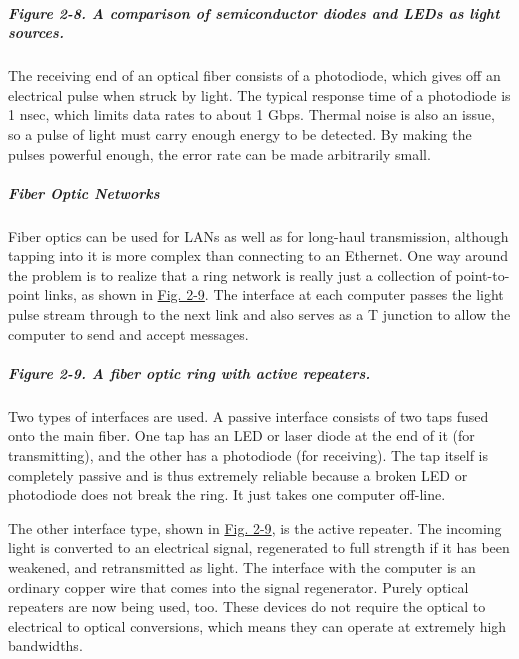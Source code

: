 \subparagraph[Figure 2-8. A comparison of semiconductor diodes and LEDs
as light
sources.]{\texorpdfstring{\protect\hypertarget{0130661023_ch02lev1sec2.htmlux5cux23ch02fig08}{}{}Figure
2-8. A comparison of semiconductor diodes and LEDs as light
sources.}{Figure 2-8. A comparison of semiconductor diodes and LEDs as light sources.}}


The receiving end of an optical fiber consists of a photodiode, which
gives off an electrical pulse when struck by light. The typical response
time of a photodiode is 1 nsec, which limits data rates to about 1 Gbps.
Thermal noise is also an issue, so a pulse of light must carry enough
energy to be detected. By making the pulses powerful enough, the error
rate can be made arbitrarily small.

\protect\hypertarget{0130661023_ch02lev1sec2.htmlux5cux23ch02lev3sec3}{}{}

\subparagraph{Fiber Optic Networks}

Fiber optics can be used for LANs as well as for long-haul transmission,
although tapping into it is more complex than connecting to an Ethernet.
One way around the problem is to realize that a ring network is really
just a collection of point-to-point links, as shown in
\protect\hyperlink{0130661023_ch02lev1sec2.htmlux5cux23ch02fig09}{Fig.
2-9}. The interface at each computer passes the light pulse stream
through to the next link and also serves as a T junction to allow the
computer to send and accept messages.

\subparagraph[Figure 2-9. A fiber optic ring with active
repeaters.]{\texorpdfstring{\protect\hypertarget{0130661023_ch02lev1sec2.htmlux5cux23ch02fig09}{}{}Figure
2-9. A fiber optic ring with active
repeaters.}{Figure 2-9. A fiber optic ring with active repeaters.}}


Two types of interfaces are used. A passive interface consists of two
taps fused onto the main fiber. One tap has an LED or laser diode at the
end of it (for transmitting), and the other has a photodiode (for
receiving). The tap itself is completely passive and is thus extremely
reliable because a broken LED or photodiode does not break the ring. It
just takes one computer off-line.

The other interface type, shown in
\protect\hyperlink{0130661023_ch02lev1sec2.htmlux5cux23ch02fig09}{Fig.
2-9}, is the {active repeater}. The incoming light is converted to an
electrical signal, regenerated to full strength if it has been weakened,
and retransmitted as light. The interface with the computer is an
ordinary copper wire that comes into the signal regenerator. Purely
optical repeaters are now being used, too. These devices do not require
the optical to electrical to optical conversions, which means they can
operate at extremely high bandwidths.

